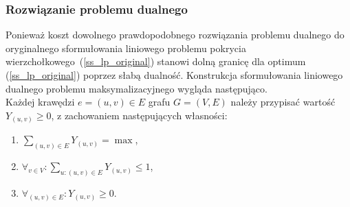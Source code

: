 \subsubsection{\textbf{Rozwiązanie problemu dualnego}}
\par{
  Ponieważ koszt dowolnego prawdopodobnego rozwiązania problemu
  dualnego do oryginalnego sformułowania liniowego problemu pokrycia
  wierzchołkowego~(\ref{ss_lp_original}) stanowi dolną granicę dla optimum
  (\ref{ss_lp_original}) poprzez słabą dualność. 
  Konstrukcja sformułowania liniowego dualnego problemu maksymalizacyjnego wygląda
  następująco.\\
  Każdej krawędzi $e=(u,v) \in E$ grafu $G=(V,E)$ należy przypisać wartość
  $Y_{(u,v)} \geq 0$, z zachowaniem następujących własności:
  \begin{enumerate}
    \item $\sum_{(u,v) \in E}Y_{(u,v)} = \max$,
    \item $\forall_{v \in V}:\sum_{u:(u,v)\in E}Y_{(u,v)} \leq 1$,
    \item $\forall_{(u,v) \in E}: Y_{(u,v)} \geq 0$.
  \end{enumerate}
}